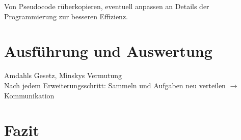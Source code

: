 \documentclass[a4paper]{scrartcl}
\begin{document}
Von Pseudocode rüberkopieren, eventuell anpassen an Details der Programmierung zur besseren Effizienz.



\section{Ausführung und Auswertung}
Amdahls Gesetz, Minskys Vermutung\\
Nach jedem Erweiterungsschritt: Sammeln und Aufgaben neu verteilen $\rightarrow$ Kommunikation

\section{Fazit}

\newpage
\printbibliography[heading=bibintoc]
\end{document}
